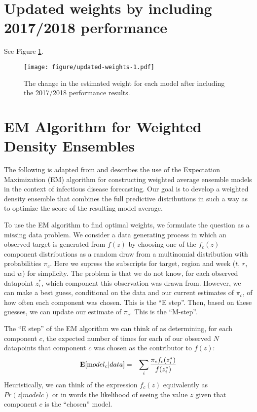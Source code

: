 \documentclass{article}\usepackage[]{graphicx}\usepackage[]{color}
\begin{document}
\section{Updated weights by including 2017/2018 performance}

See Figure \ref{fig:updated-weights}.

\begin{figure}[htbp]
\begin{center}
\texttt{[image: figure/updated-weights-1.pdf]}
\caption{The change in the estimated weight for each model after including the 2017/2018 performance results.}
\label{fig:updated-weights}
\end{center}
\end{figure}

\clearpage

\section{EM Algorithm for Weighted Density Ensembles}

The following is adapted from \cite{Rosenfeld1997,Rosenfeld2007} and describes the use of the Expectation Maximization (EM) algorithm for constructing weighted average ensemble models in the context of infectious disease forecasting.  
Our goal is to develop a weighted density ensemble that combines the full predictive distributions in such a way as to optimize the score of the resulting model average.


To use the EM algorithm to find optimal weights, we formulate the question as a missing data problem. 
We consider a data generating process in which an observed target is generated from $f(z)$ by choosing one of the $f_c(z)$ component distributions as a random draw from a multinomial distribution with probabilities $\pi_c$. 
Here we supress the subscripts for target, region and week ($t$, $r$, and $w$) for simplicity.
The problem is that we do not know, for each observed datapoint $z_i^*$, which component this observation was drawn from. 
However, we can make a best guess, conditional on the data and our current estimates of $\pi_c$, of how often each component was chosen. 
This is the ``E step''. Then, based on these guesses, we can update our estimate of $\pi_c$. This is the ``M-step''.

The ``E step'' of the EM algorithm we can think of as determining, for each component  $c$, the expected number of times for each of our observed $N$ datapoints that component $c$ was chosen as the contributor to $f(z)$:
\begin{eqnarray}
{\mathbf E}[ {\mbox model}_c |data ] %
 & = & \sum_i \frac{\pi_c f_c(z_i^*)}{f(z_i^*)} 
\end{eqnarray}
Heuristically, we can think of the expression $f_c(z)$ equivalently as $Pr(z| model c)$ or in words the likelihood of seeing the value $z$ given that component $c$ is the ``chosen'' model. 
\end{document}
